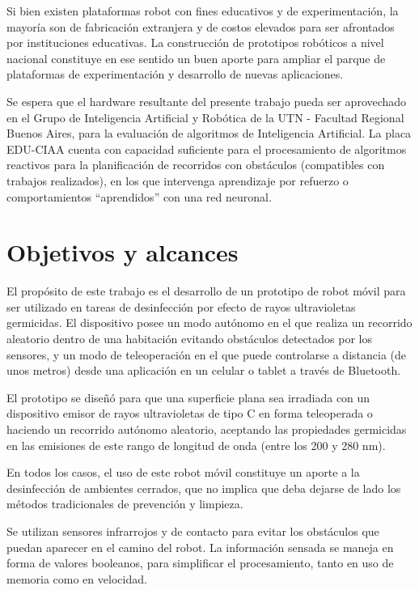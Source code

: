 Si bien existen plataformas robot con fines educativos y de experimentación, la mayoría son de fabricación extranjera y de costos elevados para ser afrontados por instituciones educativas. La construcción de prototipos robóticos a nivel nacional constituye en ese sentido un buen aporte para ampliar el parque de plataformas de experimentación y desarrollo de nuevas aplicaciones.

Se espera que el hardware resultante del presente trabajo pueda ser aprovechado en el Grupo de Inteligencia Artificial y Robótica de la UTN - Facultad Regional Buenos Aires, para la evaluación de algoritmos de Inteligencia Artificial. La placa EDU-CIAA cuenta con capacidad suficiente para el procesamiento de algoritmos reactivos para la planificación de recorridos con obstáculos (compatibles con trabajos realizados), en los que intervenga aprendizaje por refuerzo o comportamientos “aprendidos” con una red neuronal. 


\section{Objetivos y alcances}


El propósito de este trabajo es el desarrollo de un prototipo de robot móvil para ser utilizado en tareas de desinfección por efecto de rayos ultravioletas germicidas.
El dispositivo posee un modo autónomo en el que realiza un recorrido aleatorio dentro de una habitación evitando obstáculos detectados por los sensores, y un modo de teleoperación en el que puede controlarse a distancia (de unos metros) desde una aplicación en un celular o tablet a través de Bluetooth.

El prototipo se diseñó para que una superficie plana sea irradiada con un dispositivo emisor de rayos ultravioletas de tipo C en forma teleoperada o haciendo un recorrido autónomo aleatorio, aceptando las propiedades germicidas en las emisiones de este rango de longitud de onda (entre los 200 y 280 nm). 

En todos los casos, el uso de este robot móvil constituye un aporte a la desinfección de ambientes cerrados, que no implica que deba dejarse de lado los métodos tradicionales de prevención y limpieza. 


Se utilizan sensores infrarrojos y de contacto para evitar los obstáculos que puedan aparecer en el camino del robot. La información sensada se maneja en forma de valores booleanos, para simplificar el procesamiento, tanto en uso de memoria como en velocidad. 

